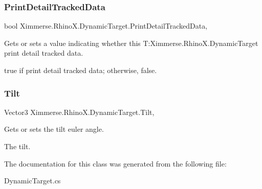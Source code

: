 \subsubsection{\texorpdfstring{Print\+Detail\+Tracked\+Data}{PrintDetailTrackedData}}
{\footnotesize\ttfamily bool Ximmerse.\+Rhino\+X.\+Dynamic\+Target.\+Print\+Detail\+Tracked\+Data\hspace{0.3cm}{\ttfamily [get]}, {\ttfamily [set]}}



Gets or sets a value indicating whether this T\+:\+Ximmerse.\+Rhino\+X.\+Dynamic\+Target print detail tracked data. 

{\ttfamily true} if print detail tracked data; otherwise, {\ttfamily false}.\mbox{\label{class_ximmerse_1_1_rhino_x_1_1_dynamic_target_a37e5698a43ecbe8551c95a4778498e1f}} 
\subsubsection{\texorpdfstring{Tilt}{Tilt}}
{\footnotesize\ttfamily Vector3 Ximmerse.\+Rhino\+X.\+Dynamic\+Target.\+Tilt\hspace{0.3cm}{\ttfamily [get]}, {\ttfamily [set]}}



Gets or sets the tilt euler angle. 

The tilt.

The documentation for this class was generated from the following file\+:\begin{DoxyCompactItemize}
\item 
Dynamic\+Target.\+cs\end{DoxyCompactItemize}
